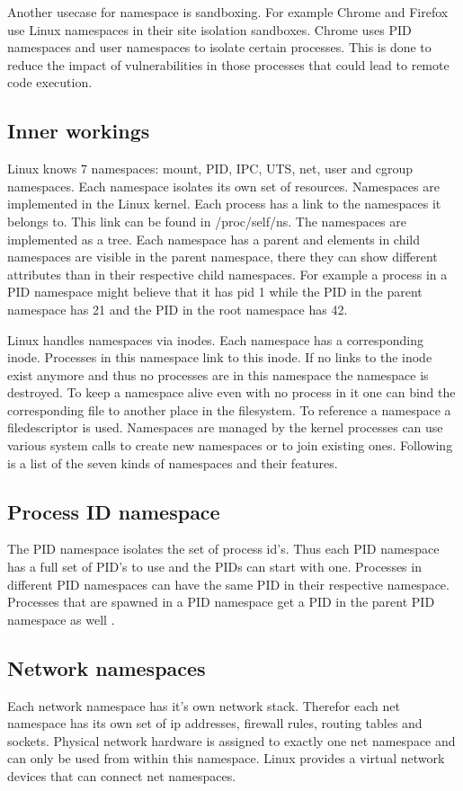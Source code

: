 \documentclass[10pt,twocolumn,a4paper]{article}
\begin{document}
Another usecase for namespace is sandboxing. For example Chrome and Firefox use Linux namespaces
in their site isolation sandboxes. 
Chrome uses PID namespaces and user namespaces to isolate certain processes.
This is done to reduce the impact of vulnerabilities in those processes that could lead to remote code execution.


\subsection{Inner workings}
Linux knows 7 namespaces: mount, PID, IPC, UTS, net, user and cgroup namespaces. Each namespace isolates its own set of resources. Namespaces are implemented in the Linux kernel.
Each process has a link to the namespaces it belongs to. This link can be found in /proc/self/ns\cite{8}. The namespaces are implemented as a tree. Each namespace has a parent and 
elements in child namespaces are visible in the parent namespace, there they can show different
attributes than in their respective child namespaces. For example a process in a PID namespace might 
believe that it has pid 1 while the PID in the parent namespace has 21 and the PID in the root
namespace has 42.

Linux handles namespaces via inodes. Each namespace has a corresponding inode. Processes in this
namespace link to this inode. If no links to the inode exist anymore and thus no processes are in
this namespace the namespace is destroyed. To keep a namespace alive even with no process in it
one can bind the corresponding file to another place in the filesystem. To reference a namespace a
filedescriptor is used. Namespaces are managed by the kernel processes can use various system
calls to create new namespaces or to join existing ones.\cite{8} Following is a list of the seven
kinds of namespaces and their features.


\subsection{Process ID namespace}
The PID namespace isolates the set of process id's. 
Thus each PID namespace has a full set of PID's to use and  the PIDs can start with one.
Processes in different PID namespaces can have the same PID in their respective namespace. 
Processes that are spawned in a PID namespace get a PID in the parent PID namespace as well 
\cite{11}.

\subsection{Network namespaces}
Each network namespace has it's own network stack. Therefor each net namespace has its own set of ip
addresses, firewall rules, routing tables and sockets. Physical network hardware is assigned to exactly one
net namespace and can only be used from within this namespace. Linux provides a virtual network
devices that can connect net namespaces.\cite{10}
\end{document}
